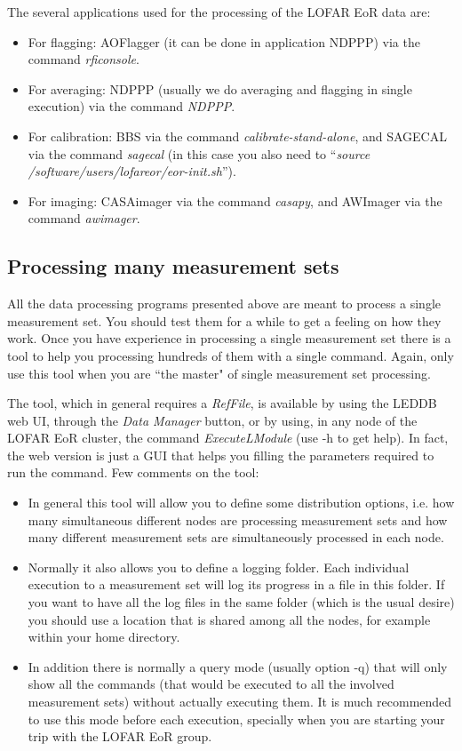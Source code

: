 \documentclass[a4paper,11pt]{article}
\begin{document}
The several applications used for the processing of the LOFAR EoR data are:

\begin{itemize}
	\item For flagging: AOFlagger (it can be done in application NDPPP) via the command \textit{rficonsole}.
	\item For averaging: NDPPP (usually we do averaging and flagging in single execution) via the command \textit{NDPPP}.
	\item For calibration: BBS via the command \textit{calibrate-stand-alone}, and SAGECAL via the command \textit{sagecal} (in this case you also need to ``\textit{source /software/users/lofareor/eor-init.sh}'').
	\item For imaging: CASAimager via the command \textit{casapy}, and AWImager via the command \textit{awimager}.
\end{itemize}

\subsection*{Processing many measurement sets}

All the data processing programs presented above are meant to process a single measurement set. You should test them for a while to get a feeling on how they work. Once you have experience in processing a single measurement set there is a tool to help you processing hundreds of them with a single command. Again, only use this tool when you are ``the master" of single measurement set processing.

The tool, which in general requires a \textit{RefFile}, is available by using the LEDDB web UI, through the \textit{Data Manager} button, or by using, in any node of the LOFAR EoR cluster, the command \textit{ExecuteLModule} (use -h to get help). In fact, the web version is just a GUI that helps you filling the parameters required to run the command. Few comments on the tool:

\begin{itemize}
	\item In general this tool will allow you to define some distribution options, i.e. how many simultaneous different nodes are processing measurement sets and how many different measurement sets are simultaneously processed in each node. 
	\item Normally it also allows you to define a logging folder. Each individual execution to a measurement set will log its progress in a file in this folder. If you want to have all the log files in the same folder (which is the usual desire) you should use a location that is shared among all the nodes, for example within your home directory.
	\item In addition there is normally a query mode (usually option -q) that will only show all the commands (that would be executed to all the involved measurement sets) without actually executing them. It is much recommended to use this mode before each execution, specially when you are starting your trip with the LOFAR EoR group.
\end{itemize}
\end{document}
